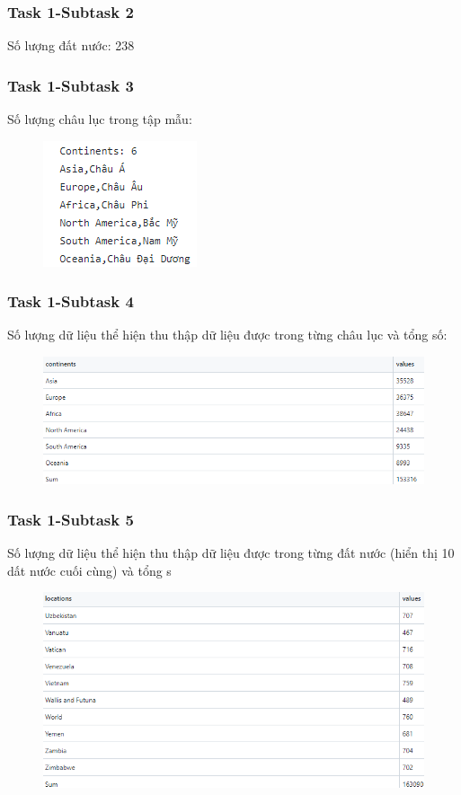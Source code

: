 \documentclass[english,10pt,table]{beamer}
\begin{document}
\frame
{
    \frametitle{Task 1-Subtask 2}
    \begin{block}{Số lượng đất nước:}
    238
    \end{block}
}
\frame
{
    \frametitle{Task 1-Subtask 3}
    \begin{block}{Số lượng châu lục trong tập mẫu:}
    \begin{figure}
        \centering
        \includegraphics{images/1.3.png}
    \end{figure}
    \end{block}
}
\frame
{
    \frametitle{Task 1-Subtask 4}
    \begin{block}{Số lượng dữ liệu thể hiện thu thập dữ liệu được trong từng châu lục và tổng số:}
    \begin{figure}
        \centering
        \includegraphics[scale=0.5]{images/1.4.png}
    \end{figure}
    \end{block}
}
\frame
{
    \frametitle{Task 1-Subtask 5}
    \begin{block}{Số lượng dữ liệu thể hiện thu thập dữ liệu được trong từng đất nước (hiển thị 10 dất nước cuối cùng) và tổng s}
    \begin{figure}
        \centering
        \includegraphics[scale=0.5]{images/1.5.png}
    \end{figure}
    \end{block}
}
\end{document}
